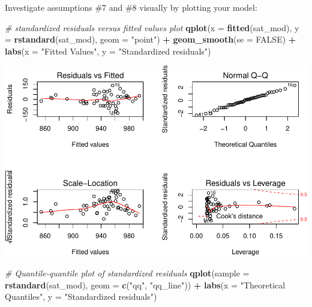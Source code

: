 \documentclass[
]{book}
\newenvironment{Shaded}{\begin{snugshade}}{\end{snugshade}}
\newcommand{\CommentTok}[1]{\textcolor[rgb]{0.56,0.35,0.01}{\textit{#1}}}
\newcommand{\DataTypeTok}[1]{\textcolor[rgb]{0.13,0.29,0.53}{#1}}
\newcommand{\KeywordTok}[1]{\textcolor[rgb]{0.13,0.29,0.53}{\textbf{#1}}}
\newcommand{\NormalTok}[1]{#1}
\newcommand{\OperatorTok}[1]{\textcolor[rgb]{0.81,0.36,0.00}{\textbf{#1}}}
\newcommand{\OtherTok}[1]{\textcolor[rgb]{0.56,0.35,0.01}{#1}}
\newcommand{\StringTok}[1]{\textcolor[rgb]{0.31,0.60,0.02}{#1}}
\begin{document}
Investigate assumptions \#7 and \#8 visually by plotting your model:

\begin{Shaded}
\begin{Highlighting}[]
  \CommentTok{\# standardized residuals versus fitted values plot}
  \KeywordTok{qplot}\NormalTok{(}\DataTypeTok{x =} \KeywordTok{fitted}\NormalTok{(sat\_mod), }\DataTypeTok{y =} \KeywordTok{rstandard}\NormalTok{(sat\_mod), }\DataTypeTok{geom =} \StringTok{"point"}\NormalTok{) }\OperatorTok{+}
\StringTok{      }\KeywordTok{geom\_smooth}\NormalTok{(}\DataTypeTok{se =} \OtherTok{FALSE}\NormalTok{) }\OperatorTok{+}
\StringTok{      }\KeywordTok{labs}\NormalTok{(}\DataTypeTok{x =} \StringTok{"Fitted Values"}\NormalTok{, }\DataTypeTok{y =} \StringTok{"Standardized residuals"}\NormalTok{)}
\end{Highlighting}
\end{Shaded}

\includegraphics{R/Rmodels/figures/unnamed-chunk-91-1.pdf}

\begin{Shaded}
\begin{Highlighting}[]
  \CommentTok{\# Quantile{-}quantile plot of standardized residuals}
  \KeywordTok{qplot}\NormalTok{(}\DataTypeTok{sample =} \KeywordTok{rstandard}\NormalTok{(sat\_mod), }\DataTypeTok{geom =} \KeywordTok{c}\NormalTok{(}\StringTok{"qq"}\NormalTok{, }\StringTok{"qq\_line"}\NormalTok{)) }\OperatorTok{+}\StringTok{ }
\StringTok{      }\KeywordTok{labs}\NormalTok{(}\DataTypeTok{x =} \StringTok{"Theoretical Quantiles"}\NormalTok{, }\DataTypeTok{y =} \StringTok{"Standardized residuals"}\NormalTok{)}
\end{Highlighting}
\end{Shaded}
\end{document}
